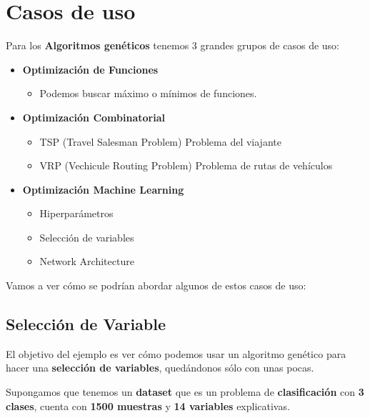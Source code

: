 \documentclass[
  a4paper,
  DIV=11,
  numbers=noendperiod]{scrreprt}
\providecommand{\tightlist}{%
  \setlength{\itemsep}{0pt}\setlength{\parskip}{0pt}}\usepackage{longtable,booktabs,array}
\begin{document}
\section{Casos de uso}\label{casos-de-uso-1}

Para los \textbf{Algoritmos genéticos} tenemos 3 grandes grupos de casos
de uso:

\begin{itemize}
\tightlist
\item
  \textbf{Optimización de Funciones}

  \begin{itemize}
  \tightlist
  \item
    Podemos buscar máximo o mínimos de funciones.
  \end{itemize}
\item
  \textbf{Optimización Combinatorial}

  \begin{itemize}
  \tightlist
  \item
    TSP (Travel Salesman Problem) Problema del viajante
  \item
    VRP (Vechicule Routing Problem) Problema de rutas de vehículos
  \end{itemize}
\item
  \textbf{Optimización Machine Learning}

  \begin{itemize}
  \tightlist
  \item
    Hiperparámetros
  \item
    Selección de variables
  \item
    Network Architecture
  \end{itemize}
\end{itemize}

Vamos a ver cómo se podrían abordar algunos de estos casos de uso:

\subsection{Selección de Variable}\label{selecciuxf3n-de-variable}

El objetivo del ejemplo es ver cómo podemos usar un algoritmo genético
para hacer una \textbf{selección de variables}, quedándonos sólo con
unas pocas.

Supongamos que tenemos un \textbf{dataset} que es un problema de
\textbf{clasificación} con \textbf{3 clases}, cuenta con \textbf{1500
muestras} y \textbf{14 variables} explicativas.
\end{document}
